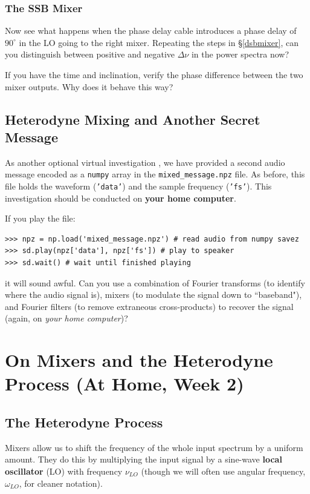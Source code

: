 \documentclass[11pt,preprint]{aastex}
\begin{document}
\subsubsection{The SSB Mixer}

\noindent
Now see what happens when the phase delay cable introduces a 
phase delay of $90^\circ$ in the LO going to the right mixer.
Repeating the steps in \S \ref{dsbmixer},
can you distinguish between positive and negative
$\Delta\nu$ in the power spectra now?

If you have the time and inclination, verify the phase difference
between the two mixer outputs.
Why does it behave this way?  

{\color{red}
\subsection{Heterodyne Mixing and Another Secret Message}

As another optional virtual investigation ,
we have provided a second audio message encoded as a {\tt numpy} array in the 
{\tt mixed\_message.npz} file. As before, this file holds the waveform ({\tt 'data'}) and the sample
frequency ({\tt 'fs'}). This investigation should be conducted on {\bf your home computer}.

If you play the file:
\begin{verbatim}
>>> npz = np.load('mixed_message.npz') # read audio from numpy savez
>>> sd.play(npz['data'], npz['fs']) # play to speaker
>>> sd.wait() # wait until finished playing
\end{verbatim}
it will sound awful. Can you use a combination of Fourier transforms (to identify where the audio signal
is), mixers (to modulate the signal down to ``baseband"), and Fourier filters (to remove extraneous 
cross-products) to recover the signal (again, on {\it your home computer})?}



\section {On Mixers and the Heterodyne
  Process (At Home, Week 2)} \label{hetereo}

%
\subsection{The Heterodyne Process}
%
\noindent
Mixers allow us to shift the frequency of the
whole input spectrum by a uniform amount.  They do this by multiplying
the input signal by a sine-wave {\bf local oscillator} (LO) with frequency
$\nu_{LO}$ (though we will often use
angular frequency, $\omega_{LO}$, for cleaner notation).
\end{document}
